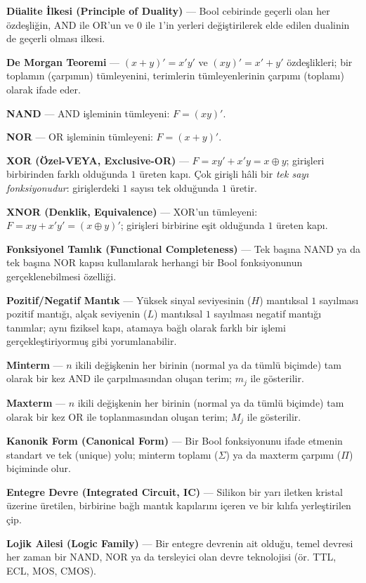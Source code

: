 \textbf{Düalite İlkesi (Principle of Duality)} --- Bool cebirinde geçerli olan her
özdeşliğin, AND ile OR'un ve $0$ ile $1$'in yerleri değiştirilerek elde edilen dualinin de
geçerli olması ilkesi.

\textbf{De Morgan Teoremi} --- $(x+y)'=x'y'$ ve $(xy)'=x'+y'$ özdeşlikleri; bir toplamın
(çarpımın) tümleyenini, terimlerin tümleyenlerinin çarpımı (toplamı) olarak ifade eder.

\textbf{NAND} --- AND işleminin tümleyeni: $F=(xy)'$.

\textbf{NOR} --- OR işleminin tümleyeni: $F=(x+y)'$.

\textbf{XOR (Özel-VEYA, Exclusive-OR)} --- $F=xy'+x'y=x\oplus y$; girişleri birbirinden
farklı olduğunda $1$ üreten kapı. Çok girişli hâli bir \emph{tek sayı fonksiyonudur}: girişlerdeki
$1$ sayısı tek olduğunda $1$ üretir.

\textbf{XNOR (Denklik, Equivalence)} --- XOR'un tümleyeni: $F=xy+x'y'=(x\oplus y)'$;
girişleri birbirine eşit olduğunda $1$ üreten kapı.

\textbf{Fonksiyonel Tamlık (Functional Completeness)} --- Tek başına NAND ya da tek başına
NOR kapısı kullanılarak herhangi bir Bool fonksiyonunun gerçeklenebilmesi özelliği.

\textbf{Pozitif/Negatif Mantık} --- Yüksek sinyal seviyesinin ($H$) mantıksal $1$ sayılması
pozitif mantığı, alçak seviyenin ($L$) mantıksal $1$ sayılması negatif mantığı tanımlar; aynı
fiziksel kapı, atamaya bağlı olarak farklı bir işlemi gerçekleştiriyormuş gibi yorumlanabilir.

\textbf{Minterm} --- $n$ ikili değişkenin her birinin (normal ya da tümlü biçimde) tam
olarak bir kez AND ile çarpılmasından oluşan terim; $m_j$ ile gösterilir.

\textbf{Maxterm} --- $n$ ikili değişkenin her birinin (normal ya da tümlü biçimde) tam
olarak bir kez OR ile toplanmasından oluşan terim; $M_j$ ile gösterilir.

\textbf{Kanonik Form (Canonical Form)} --- Bir Bool fonksiyonunu ifade etmenin standart ve
tek (unique) yolu; minterm toplamı ($\Sigma$) ya da maxterm çarpımı ($\Pi$) biçiminde olur.

\textbf{Entegre Devre (Integrated Circuit, IC)} --- Silikon bir yarı iletken kristal
üzerine üretilen, birbirine bağlı mantık kapılarını içeren ve bir kılıfa yerleştirilen çip.

\textbf{Lojik Ailesi (Logic Family)} --- Bir entegre devrenin ait olduğu, temel devresi her
zaman bir NAND, NOR ya da tersleyici olan devre teknolojisi (ör. TTL, ECL, MOS, CMOS).

